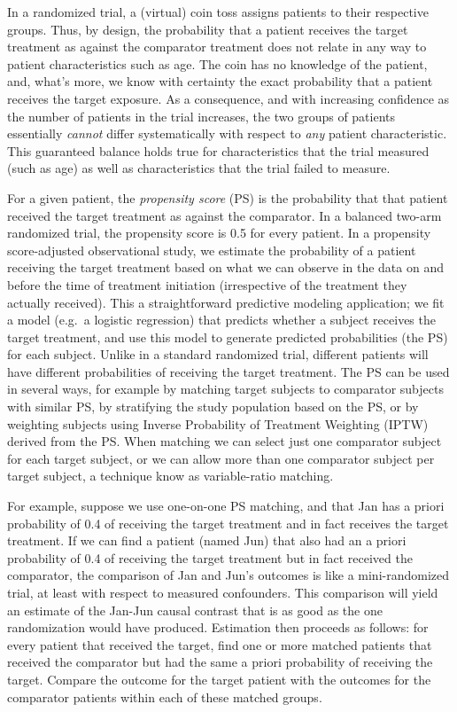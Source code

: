 \documentclass[11pt]{book}
\begin{document}
In a randomized trial, a (virtual) coin toss assigns patients to their
respective groups. Thus, by design, the probability that a patient
receives the target treatment as against the comparator treatment does
not relate in any way to patient characteristics such as age. The coin
has no knowledge of the patient, and, what's more, we know with
certainty the exact probability that a patient receives the target
exposure. As a consequence, and with increasing confidence as the number
of patients in the trial increases, the two groups of patients
essentially \emph{cannot} differ systematically with respect to
\emph{any} patient characteristic. This guaranteed balance holds true
for characteristics that the trial measured (such as age) as well as
characteristics that the trial failed to measure.

For a given patient, the \emph{propensity score} (PS) is the probability
that that patient received the target treatment as against the
comparator. \citep{rosenbaum_1983} In a balanced two-arm randomized
trial, the propensity score is 0.5 for every patient. In a propensity
score-adjusted observational study, we estimate the probability of a
patient receiving the target treatment based on what we can observe in
the data on and before the time of treatment initiation (irrespective of
the treatment they actually received). This a straightforward predictive
modeling application; we fit a model (e.g.~a logistic regression) that
predicts whether a subject receives the target treatment, and use this
model to generate predicted probabilities (the PS) for each subject.
Unlike in a standard randomized trial, different patients will have
different probabilities of receiving the target treatment. The PS can be
used in several ways, for example by matching target subjects to
comparator subjects with similar PS, by stratifying the study population
based on the PS, or by weighting subjects using Inverse Probability of
Treatment Weighting (IPTW) derived from the PS. When matching we can
select just one comparator subject for each target subject, or we can
allow more than one comparator subject per target subject, a technique
know as variable-ratio matching. \citep{rassen_2012}

For example, suppose we use one-on-one PS matching, and that Jan has a
priori probability of 0.4 of receiving the target treatment and in fact
receives the target treatment. If we can find a patient (named Jun) that
also had an a priori probability of 0.4 of receiving the target
treatment but in fact received the comparator, the comparison of Jan and
Jun's outcomes is like a mini-randomized trial, at least with respect to
measured confounders. This comparison will yield an estimate of the
Jan-Jun causal contrast that is as good as the one randomization would
have produced. Estimation then proceeds as follows: for every patient
that received the target, find one or more matched patients that
received the comparator but had the same a priori probability of
receiving the target. Compare the outcome for the target patient with
the outcomes for the comparator patients within each of these matched
groups.
\end{document}
